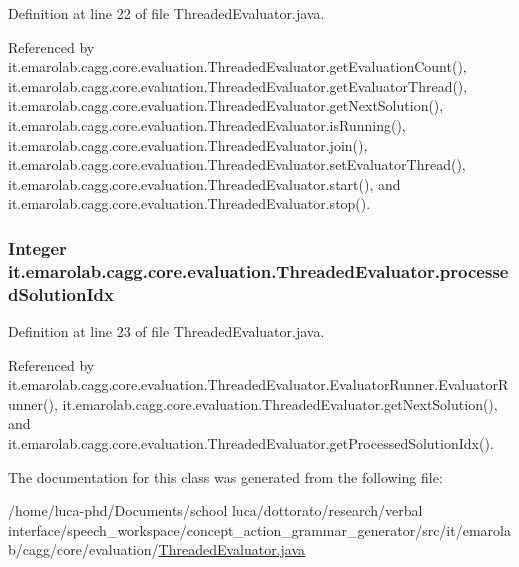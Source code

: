 Definition at line 22 of file Threaded\-Evaluator.\-java.



Referenced by it.\-emarolab.\-cagg.\-core.\-evaluation.\-Threaded\-Evaluator.\-get\-Evaluation\-Count(), it.\-emarolab.\-cagg.\-core.\-evaluation.\-Threaded\-Evaluator.\-get\-Evaluator\-Thread(), it.\-emarolab.\-cagg.\-core.\-evaluation.\-Threaded\-Evaluator.\-get\-Next\-Solution(), it.\-emarolab.\-cagg.\-core.\-evaluation.\-Threaded\-Evaluator.\-is\-Running(), it.\-emarolab.\-cagg.\-core.\-evaluation.\-Threaded\-Evaluator.\-join(), it.\-emarolab.\-cagg.\-core.\-evaluation.\-Threaded\-Evaluator.\-set\-Evaluator\-Thread(), it.\-emarolab.\-cagg.\-core.\-evaluation.\-Threaded\-Evaluator.\-start(), and it.\-emarolab.\-cagg.\-core.\-evaluation.\-Threaded\-Evaluator.\-stop().

\hypertarget{classit_1_1emarolab_1_1cagg_1_1core_1_1evaluation_1_1ThreadedEvaluator_ac70202c42ba3b8a6e3422dac9baaaba8}{
\subsubsection[{processed\-Solution\-Idx}]{\setlength{\rightskip}{0pt plus 5cm}Integer it.\-emarolab.\-cagg.\-core.\-evaluation.\-Threaded\-Evaluator.\-processed\-Solution\-Idx\hspace{0.3cm}{\ttfamily [private]}}}\label{classit_1_1emarolab_1_1cagg_1_1core_1_1evaluation_1_1ThreadedEvaluator_ac70202c42ba3b8a6e3422dac9baaaba8}


Definition at line 23 of file Threaded\-Evaluator.\-java.



Referenced by it.\-emarolab.\-cagg.\-core.\-evaluation.\-Threaded\-Evaluator.\-Evaluator\-Runner.\-Evaluator\-Runner(), it.\-emarolab.\-cagg.\-core.\-evaluation.\-Threaded\-Evaluator.\-get\-Next\-Solution(), and it.\-emarolab.\-cagg.\-core.\-evaluation.\-Threaded\-Evaluator.\-get\-Processed\-Solution\-Idx().



The documentation for this class was generated from the following file\-:\begin{DoxyCompactItemize}
\item 
/home/luca-\/phd/\-Documents/school luca/dottorato/research/verbal interface/speech\-\_\-workspace/concept\-\_\-action\-\_\-grammar\-\_\-generator/src/it/emarolab/cagg/core/evaluation/\hyperlink{ThreadedEvaluator_8java}{Threaded\-Evaluator.\-java}\end{DoxyCompactItemize}
